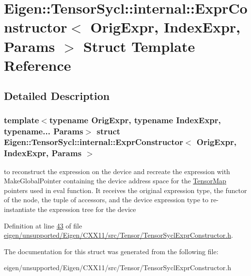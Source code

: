 \hypertarget{struct_eigen_1_1_tensor_sycl_1_1internal_1_1_expr_constructor}{}\section{Eigen\+:\+:Tensor\+Sycl\+:\+:internal\+:\+:Expr\+Constructor$<$ Orig\+Expr, Index\+Expr, Params $>$ Struct Template Reference}
\label{struct_eigen_1_1_tensor_sycl_1_1internal_1_1_expr_constructor}


\subsection{Detailed Description}
\subsubsection*{template$<$typename Orig\+Expr, typename Index\+Expr, typename... Params$>$\newline
struct Eigen\+::\+Tensor\+Sycl\+::internal\+::\+Expr\+Constructor$<$ Orig\+Expr, Index\+Expr, Params $>$}

to reconstruct the expression on the device and recreate the expression with Make\+Global\+Pointer containing the device address space for the \hyperlink{class_eigen_1_1_tensor_map}{Tensor\+Map} pointers used in eval function. It receives the original expression type, the functor of the node, the tuple of accessors, and the device expression type to re-\/instantiate the expression tree for the device 

Definition at line \hyperlink{eigen_2unsupported_2_eigen_2_c_x_x11_2src_2_tensor_2_tensor_sycl_expr_constructor_8h_source_l00043}{43} of file \hyperlink{eigen_2unsupported_2_eigen_2_c_x_x11_2src_2_tensor_2_tensor_sycl_expr_constructor_8h_source}{eigen/unsupported/\+Eigen/\+C\+X\+X11/src/\+Tensor/\+Tensor\+Sycl\+Expr\+Constructor.\+h}.



The documentation for this struct was generated from the following file\+:\begin{DoxyCompactItemize}
\item 
eigen/unsupported/\+Eigen/\+C\+X\+X11/src/\+Tensor/\+Tensor\+Sycl\+Expr\+Constructor.\+h\end{DoxyCompactItemize}
